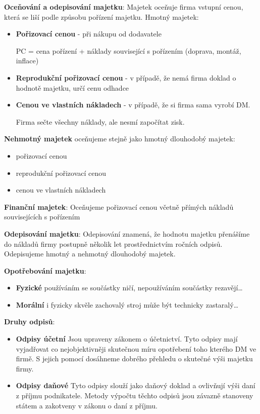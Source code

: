 \documentclass[11pt,a4paper,twoside]{book}
\begin{document}
	\textbf{Oceňování a odepisování majetku}:
	Majetek oceňuje firma vstupní cenou, která se liší podle způsobu pořízení majetku.
	Hmotný majetek:
	\begin{itemize}
		\item \textbf{Pořizovací cenou} - při nákupu od dodavatele \par PC = cena pořízení + náklady související s pořízením (doprava, montáž, inflace)
		\item \textbf{Reprodukční pořizovací cenou} - v případě, že nemá firma doklad o hodnotě majetku, určí cenu odhadce
		\item \textbf{Cenou ve vlastních nákladech} - v případě, že si firma sama vyrobí DM. \par Firma sečte všechny náklady, ale nesmí započítat zisk.
	\end{itemize}

	\textbf{Nehmotný majetek} oceňujeme stejně jako hmotný dlouhodobý majetek:
	\begin{itemize}
		\item pořizovací cenou
		\item reprodukční pořizovací cenou
		\item cenou ve vlastních nákladech
	\end{itemize}

	\textbf{Finanční majetek}:
	Oceňujeme pořizovací cenou včetně přímých nákladů souvisejících s pořízením

	\textbf{Odepisování majetku}:
	Odepisování znamená, že hodnotu majetku přenášíme do nákladů firmy postupně několik let prostřednictvím ročních odpisů. Odepisujeme hmotný a nehmotný dlouhodobý majetek.

	\textbf{Opotřebování majetku}:
	\begin{itemize}
		\item \textbf{Fyzické} používáním se součástky ničí, nepoužíváním součástky rezavějí\ldots
		\item \textbf{Morální} i fyzicky skvěle zachovalý stroj může být technicky zastaralý\ldots
	\end{itemize}

	\textbf{Druhy odpisů}:
	\begin{itemize}
		\item \textbf{Odpisy účetní} Jsou upraveny zákonem o účetnictví. Tyto odpisy mají vyjadřovat co nejobjektivněji skutečnou míru opotřebení toho kterého DM ve firmě. S jejich pomocí dosáhneme dobrého přehledu o skutečné výši majetku firmy.
		\item \textbf{Odpisy daňové} Tyto odpisy slouží jako daňový doklad a ovlivňují výši daní z příjmu podnikatele. Metody výpočtu těchto odpisů jsou závazně stanoveny státem a zakotveny v zákonu o daní z příjmu.
	\end{itemize}
\end{document}
